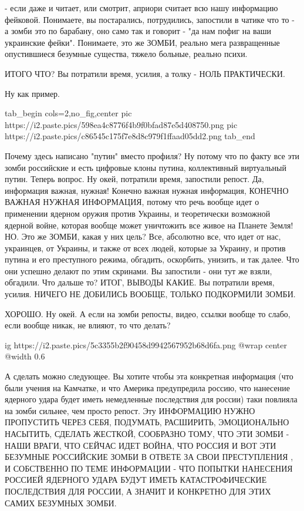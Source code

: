 - если даже и читает, или смотрит, априори считает всю нашу информацию
фейковой. Понимаете, вы постарались, потрудились, запостили в чатике что то - а
зомби это по барабану, оно само так и говорит - "да нам пофиг на ваши
украинские фейки". Понимаете, это же ЗОМБИ, реально мега развращенные
опустившиеся безумные существа, тяжело больные, реально психи. 

ИТОГО ЧТО? Вы потратили время, усилия, а толку - НОЛЬ ПРАКТИЧЕСКИ.

Ну как пример. 

\ifcmt
  tab_begin cols=2,no_fig,center
     pic https://i2.paste.pics/598ea4c8776f4b9f0bfad87e5d408750.png
		 pic https://i2.paste.pics/c86545c175f7e8d8c979f1ffaad05dd2.png
  tab_end
\fi

Почему здесь написано "путин" вместо профиля? Ну потому что по факту все эти
зомби российские и есть цифровые клоны путина, коллективный виртуальный путин.
Теперь вопрос. Ну окей, потратили время, запостили репост. Да, информация
важная, нужная! Конечно важная нужная информация, КОНЕЧНО ВАЖНАЯ НУЖНАЯ
ИНФОРМАЦИЯ, потому что речь вообще идет о применении ядерном оружия против
Украины, и теоретически возможной ядерной войне, которая вообще может
уничтожить все живое на Планете Земля! НО. Это же ЗОМБИ, какая у них цель? Все,
абсолютно все, что идет от нас, украинцев, от Украины, и также от всех людей,
которые за Украину, и против путина и его преступного режима, обгадить,
оскорбить, унизить, и так далее. Что они успешно делают по этим скринами. Вы
запостили - они тут же взяли, обгадили. Что дальше то? ИТОГ, ВЫВОДЫ КАКИЕ. Вы
потратили время, усилия. НИЧЕГО НЕ ДОБИЛИСЬ ВООБЩЕ, ТОЛЬКО ПОДКОРМИЛИ ЗОМБИ.

ХОРОШО. Ну окей. А если на зомби репосты, видео, ссылки вообще то слабо, если
вообще никак, не влияют, то что делать?

\ifcmt
  ig https://i2.paste.pics/5c3355b2f90458d9942567952b68d6fa.png
  @wrap center
  @width 0.6
\fi

А сделать можно следующее. Вы хотите чтобы эта конкретная информация (что были
учения на Камчатке, и что Америка предупредила россию, что нанесение ядерного
удара будет иметь немедленные последствия для россии) таки повлияла на зомби
сильнее, чем просто репост. Эту ИНФОРМАЦИЮ НУЖНО ПРОПУСТИТЬ ЧЕРЕЗ СЕБЯ,
ПОДУМАТЬ, РАСШИРИТЬ, ЭМОЦИОНАЛЬНО НАСЫТИТЬ, СДЕЛАТЬ ЖЕСТКОЙ, СООБРАЗНО ТОМУ,
ЧТО ЭТИ ЗОМБИ - НАШИ ВРАГИ, ЧТО СЕЙЧАС ИДЕТ ВОЙНА, ЧТО РОССИЯ И ВОТ ЭТИ
БЕЗУМНЫЕ РОССИЙСКИЕ ЗОМБИ В ОТВЕТЕ ЗА СВОИ ПРЕСТУПЛЕНИЯ , И СОБСТВЕННО ПО ТЕМЕ
ИНФОРМАЦИИ - ЧТО ПОПЫТКИ НАНЕСЕНИЯ РОССИЕЙ ЯДЕРНОГО УДАРА БУДУТ ИМЕТЬ
КАТАСТРОФИЧЕСКИЕ ПОСЛЕДСТВИЯ ДЛЯ РОССИИ, А ЗНАЧИТ И КОНКРЕТНО ДЛЯ ЭТИХ САМИХ
БЕЗУМНЫХ ЗОМБИ.


